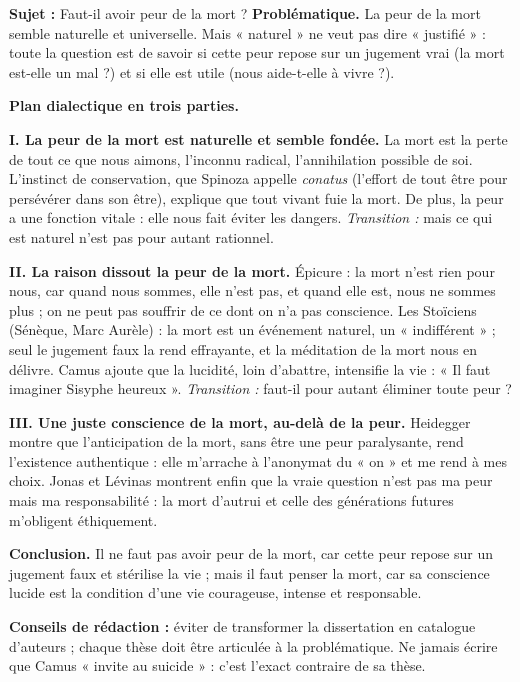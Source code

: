 \documentclass[11pt]{article}
\begin{document}
\begin{exoresolu}
\textbf{Sujet :} Faut-il avoir peur de la mort ?
\tcblower
\textbf{Problématique.} La peur de la mort semble naturelle et universelle. Mais « naturel » ne veut pas dire « justifié » : toute la question est de savoir si cette peur repose sur un jugement vrai (la mort est-elle un mal ?) et si elle est utile (nous aide-t-elle à vivre ?).

\textbf{Plan dialectique en trois parties.}

\textbf{I. La peur de la mort est naturelle et semble fondée.} La mort est la perte de tout ce que nous aimons, l'inconnu radical, l'annihilation possible de soi. L'instinct de conservation, que Spinoza appelle \emph{conatus} (l'effort de tout être pour persévérer dans son être), explique que tout vivant fuie la mort. De plus, la peur a une fonction vitale : elle nous fait éviter les dangers. \emph{Transition :} mais ce qui est naturel n'est pas pour autant rationnel.

\textbf{II. La raison dissout la peur de la mort.} Épicure : la mort n'est rien pour nous, car quand nous sommes, elle n'est pas, et quand elle est, nous ne sommes plus ; on ne peut pas souffrir de ce dont on n'a pas conscience. Les Stoïciens (Sénèque, Marc Aurèle) : la mort est un événement naturel, un « indifférent » ; seul le jugement faux la rend effrayante, et la méditation de la mort nous en délivre. Camus ajoute que la lucidité, loin d'abattre, intensifie la vie : « Il faut imaginer Sisyphe heureux ». \emph{Transition :} faut-il pour autant éliminer toute peur ?

\textbf{III. Une juste conscience de la mort, au-delà de la peur.} Heidegger montre que l'anticipation de la mort, sans être une peur paralysante, rend l'existence authentique : elle m'arrache à l'anonymat du « on » et me rend à mes choix. Jonas et Lévinas montrent enfin que la vraie question n'est pas ma peur mais ma responsabilité : la mort d'autrui et celle des générations futures m'obligent éthiquement.

\textbf{Conclusion.} Il ne faut pas avoir peur de la mort, car cette peur repose sur un jugement faux et stérilise la vie ; mais il faut penser la mort, car sa conscience lucide est la condition d'une vie courageuse, intense et responsable.

\textbf{Conseils de rédaction :} éviter de transformer la dissertation en catalogue d'auteurs ; chaque thèse doit être articulée à la problématique. Ne jamais écrire que Camus « invite au suicide » : c'est l'exact contraire de sa thèse.
\end{exoresolu}
\end{document}
